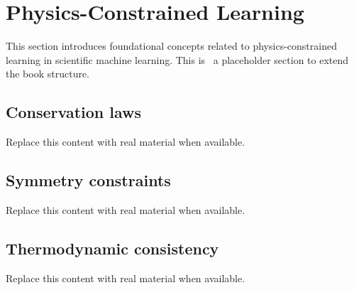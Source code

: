 \section{Physics-Constrained Learning}
This section introduces foundational concepts related to physics-constrained learning in scientific machine learning. This is~\cite{abdulmaksoudTransformerBasedSensorFusion2025} a placeholder section to extend the book structure.

\subsection{Conservation laws}
Replace this content with real material when available.

\subsection{Symmetry constraints}
Replace this content with real material when available.

\subsection{Thermodynamic consistency}
Replace this content with real material when available.
